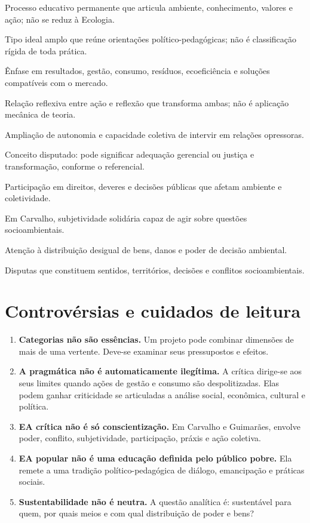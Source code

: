 \documentclass[12pt,a4paper]{article}
\begin{document}
\begin{description}[style=nextline,leftmargin=4.1cm,font=\normalfont\bfseries]
\item[Educação Ambiental] Processo educativo permanente que articula ambiente, conhecimento, valores e ação; não se reduz à Ecologia.
\item[Macrotendência] Tipo ideal amplo que reúne orientações político-pedagógicas; não é classificação rígida de toda prática.
\item[Pragmatismo ambiental] Ênfase em resultados, gestão, consumo, resíduos, ecoeficiência e soluções compatíveis com o mercado.
\item[Práxis] Relação reflexiva entre ação e reflexão que transforma ambas; não é aplicação mecânica de teoria.
\item[Emancipação] Ampliação de autonomia e capacidade coletiva de intervir em relações opressoras.
\item[Sustentabilidade] Conceito disputado: pode significar adequação gerencial ou justiça e transformação, conforme o referencial.
\item[Cidadania ambiental] Participação em direitos, deveres e decisões públicas que afetam ambiente e coletividade.
\item[Sujeito ecológico] Em Carvalho, subjetividade solidária capaz de agir sobre questões socioambientais.
\item[Justiça ambiental] Atenção à distribuição desigual de bens, danos e poder de decisão ambiental.
\item[Relações de poder] Disputas que constituem sentidos, territórios, decisões e conflitos socioambientais.
\end{description}

\section{Controvérsias e cuidados de leitura}

\begin{enumerate}
\item \textbf{Categorias não são essências.} Um projeto pode combinar dimensões de mais de uma vertente. Deve-se examinar seus pressupostos e efeitos.
\item \textbf{A pragmática não é automaticamente ilegítima.} A crítica dirige-se aos seus limites quando ações de gestão e consumo são despolitizadas. Elas podem ganhar criticidade se articuladas a análise social, econômica, cultural e política.
\item \textbf{EA crítica não é só conscientização.} Em Carvalho e Guimarães, envolve poder, conflito, subjetividade, participação, práxis e ação coletiva.
\item \textbf{EA popular não é uma educação definida pelo público pobre.} Ela remete a uma tradição político-pedagógica de diálogo, emancipação e práticas sociais.
\item \textbf{Sustentabilidade não é neutra.} A questão analítica é: sustentável para quem, por quais meios e com qual distribuição de poder e bens?
\end{enumerate}
\end{document}
